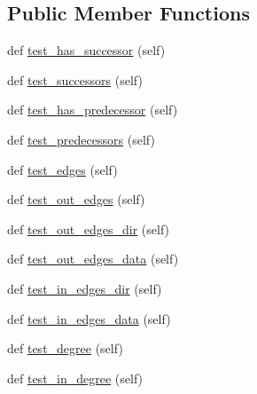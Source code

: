 \subsection*{Public Member Functions}
\begin{DoxyCompactItemize}
\item 
def \hyperlink{classnetworkx_1_1classes_1_1tests_1_1test__digraph_1_1BaseDiGraphTester_af8c94c88dcd019338bff3dadb6ca038b}{test\+\_\+has\+\_\+successor} (self)
\item 
def \hyperlink{classnetworkx_1_1classes_1_1tests_1_1test__digraph_1_1BaseDiGraphTester_a7a30e89319999dce6a20546b66f4256c}{test\+\_\+successors} (self)
\item 
def \hyperlink{classnetworkx_1_1classes_1_1tests_1_1test__digraph_1_1BaseDiGraphTester_a522b1917eb9c3c45d0f55c610ffba5e3}{test\+\_\+has\+\_\+predecessor} (self)
\item 
def \hyperlink{classnetworkx_1_1classes_1_1tests_1_1test__digraph_1_1BaseDiGraphTester_aea66df82339e86f392dfd4d664a7b9bf}{test\+\_\+predecessors} (self)
\item 
def \hyperlink{classnetworkx_1_1classes_1_1tests_1_1test__digraph_1_1BaseDiGraphTester_a20ae4549eed536d86b74d5f06fed1136}{test\+\_\+edges} (self)
\item 
def \hyperlink{classnetworkx_1_1classes_1_1tests_1_1test__digraph_1_1BaseDiGraphTester_a9f1801411ce25e5a60c0e7fed6d4e7b6}{test\+\_\+out\+\_\+edges} (self)
\item 
def \hyperlink{classnetworkx_1_1classes_1_1tests_1_1test__digraph_1_1BaseDiGraphTester_a915dd1a29d0c7c5e3567103150fccc9e}{test\+\_\+out\+\_\+edges\+\_\+dir} (self)
\item 
def \hyperlink{classnetworkx_1_1classes_1_1tests_1_1test__digraph_1_1BaseDiGraphTester_ad10595a6b77943147b83cfd0c372d525}{test\+\_\+out\+\_\+edges\+\_\+data} (self)
\item 
def \hyperlink{classnetworkx_1_1classes_1_1tests_1_1test__digraph_1_1BaseDiGraphTester_a360c112b94a0ed9a85aadb93c4ee52c5}{test\+\_\+in\+\_\+edges\+\_\+dir} (self)
\item 
def \hyperlink{classnetworkx_1_1classes_1_1tests_1_1test__digraph_1_1BaseDiGraphTester_aab5a69bbf35f7cafa686918f848ea2bb}{test\+\_\+in\+\_\+edges\+\_\+data} (self)
\item 
def \hyperlink{classnetworkx_1_1classes_1_1tests_1_1test__digraph_1_1BaseDiGraphTester_a4fe56bc4f4b9edb83861e39d57c2175b}{test\+\_\+degree} (self)
\item 
def \hyperlink{classnetworkx_1_1classes_1_1tests_1_1test__digraph_1_1BaseDiGraphTester_aedd0c4b188c4d6f6bfa9ed683e335535}{test\+\_\+in\+\_\+degree} (self)

\end{DoxyCompactItemize}
